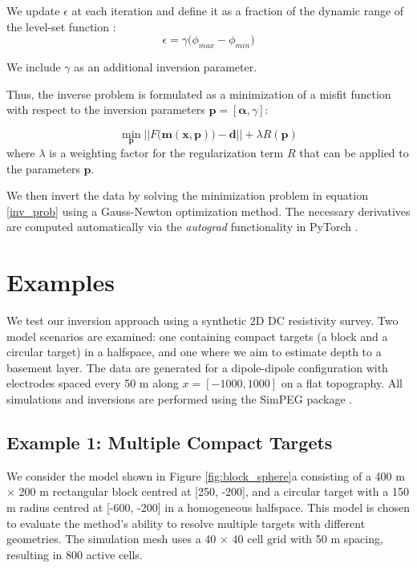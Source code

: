 \documentclass{segabs}
\begin{document}
We update $\epsilon$ at each iteration and define it as a fraction of the dynamic range of the level-set function \citep{kadu_salt_2017}:
\begin{equation}\label{trans_width}
\epsilon = \gamma\big(\phi_{max} - \phi_{min}\big)
\end{equation}

We include $\gamma$ as an additional inversion parameter.

Thus, the inverse problem is formulated as a minimization of a misfit function with respect to the inversion parameters $\mathbf{p} = [\boldsymbol{\alpha}, \gamma]$:

\begin{equation}\label{inv_prob}
\min_{\mathbf{p}} ||F\big(\mathbf{m(x,p)}\big) - \mathbf{d}|| + \lambda R({\mathbf{p}})
\end{equation}
where $\lambda$ is a weighting factor for the regularization term $R$ that can be applied to the parameters $\mathbf{p}$. 

We then invert the data by solving the minimization problem in equation \eqref{inv_prob} using a Gauss-Newton optimization method. The necessary derivatives are computed automatically via the \textit{autograd} functionality in PyTorch \citep{ansel_pytorch_2024}. 

\vspace{-0.45cm}
\section{Examples} 
\vspace{-0.25cm}

We test our inversion approach using a synthetic 2D DC resistivity survey. Two model scenarios are examined: one containing compact targets (a block and a circular target) in a halfspace, and one where we aim to estimate depth to a basement layer. The data are generated for a dipole-dipole configuration with electrodes spaced every 50 m along $x = [-1000, 1000]$ on a flat topography. All simulations and inversions are performed using the SimPEG package \citep{heagy_framework_2017,cockett_simpeg_2015}.

\subsection{Example 1: Multiple Compact Targets}
\vspace{-0.4cm}

We consider the model shown in Figure \ref{fig:block_sphere}a consisting of a 400 m $\times$ 200 m rectangular block centred at [250, -200], and a circular target with a 150 m radius centred at [-600, -200] in a homogeneous halfspace. This model is chosen to evaluate the method's ability to resolve multiple targets with different geometries. The simulation mesh uses a 40 $\times$ 40 cell grid with 50 m spacing, resulting in 800 active cells.
\end{document}
